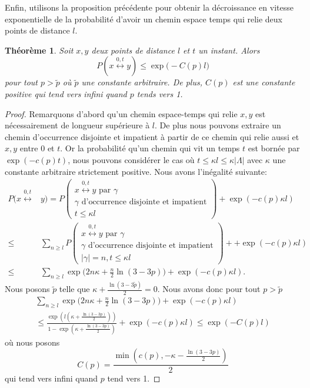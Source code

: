 \documentclass[titlepage,a4paper,12pt]{article}
\newcounter{d}
\newcounter{t}
\newcounter{p}
\newcounter{c}
\newcounter{a}
\newcounter{l}
\newtheorem{thm}[t]{Théorème}
\begin{document}
Enfin, utilisons la proposition précédente pour obtenir la décroissance en vitesse exponentielle de la probabilité d'avoir un chemin espace temps qui relie deux points de distance $l$.
\begin{thm} Soit $x,y$ deux points de distance $l$ et $t$ un instant. Alors 
$$P(x\overset{0,t}{\longleftrightarrow} y)\leqslant \exp\big(-C(p)l\big)
$$pour tout $p > \tilde{p}$ où $\tilde{p}$ une constante arbitraire. De plus, $C(p)$ est une constante positive qui tend vers infini quand $p$ tends vers 1.
\end{thm}
\begin{proof}
Remarquons d'abord qu'un chemin espace-temps qui relie $x,y$ est nécessairement de longueur supérieure à $l$. De plus nous pouvons extraire un chemin d'occurrence disjointe et impatient à partir de ce chemin qui relie aussi et $x,y$ entre $0$ et $t$. Or la probabilité qu'un chemin qui vit un temps $t$ est bornée par $\exp(-c(p)t)$, nous pouvons considérer le cas où $t\leqslant \kappa l \leqslant \kappa |\Lambda|$ avec $\kappa$ une constante arbitraire strictement positive.  Nous avons l'inégalité suivante:
\begin{align*}
P(x\overset{0,t}{\longleftrightarrow}& y)=P\left(\begin{array}{c}x\overset{0,t}{\longleftrightarrow} y\text{ par }\gamma\\\gamma \text{ d'occurrence disjointe et impatient}\\ t \leqslant \kappa l\end{array}\right) + \exp(-c(p)\kappa l)\\
\leqslant& \sum_{n\geqslant l}P\left(\begin{array}{c}x\overset{0,t}{\longleftrightarrow} y\text{ par }\gamma\\\gamma \text{ d'occurrence disjointe et impatient}\\ |\gamma| = n, t \leqslant \kappa l\end{array}\right)+ + \exp(-c(p)\kappa l)\\
\leqslant& \sum_{n\geqslant l} \exp\big(2n\kappa+\frac{n}{2}\ln(3-3p)\big) + \exp(-c(p)\kappa l).
\end{align*}
Nous posons $\tilde{p}$ telle que $\kappa+\frac{\ln(3-3\tilde{p})}{2} = 0$. Nous avons donc pour tout $p>\tilde{p}$
\begin{multline*} \sum_{n\geqslant l} \exp\big(2n\kappa+\frac{n}{2}\ln(3-3p)\big) + \exp(-c(p)\kappa l) \\
\leqslant \frac{\exp(l(\kappa+\frac{\ln(3-3p)}{2}))}{1-\exp(\kappa+\frac{\ln(3-3p)}{2})}+\exp(-c(p)\kappa l)\leqslant \exp(-C(p)l)
\end{multline*}
où nous posons $$C(p) = \frac{\min(c(p),-\kappa-\frac{\ln(3-3p)}{2})}{2}$$ qui tend vers infini quand $p$ tend vers 1.
\end{proof}
\end{document}
